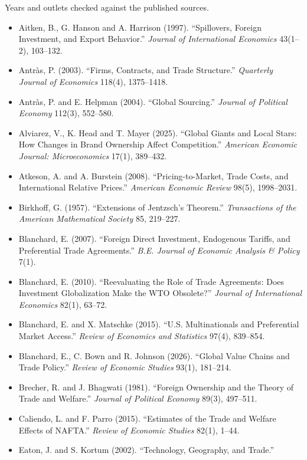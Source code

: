 \documentclass[11pt]{article}
\theoremstyle{plain}
\theoremstyle{remark}
\theoremstyle{definition}
\begin{document}
Years and outlets checked against the published sources.

\begin{itemize}[leftmargin=1.4em]
\item Aitken, B., G. Hanson and A. Harrison (1997). ``Spillovers, Foreign Investment,
and Export Behavior.'' \emph{Journal of International Economics} 43(1--2), 103--132.
\item Antr\`as, P. (2003). ``Firms, Contracts, and Trade Structure.''
\emph{Quarterly Journal of Economics} 118(4), 1375--1418.
\item Antr\`as, P. and E. Helpman (2004). ``Global Sourcing.''
\emph{Journal of Political Economy} 112(3), 552--580.
\item Alviarez, V., K. Head and T. Mayer (2025). ``Global Giants and Local Stars: How
Changes in Brand Ownership Affect Competition.'' \emph{American Economic Journal:
Microeconomics} 17(1), 389--432.
\item Atkeson, A. and A. Burstein (2008). ``Pricing-to-Market, Trade Costs, and
International Relative Prices.'' \emph{American Economic Review} 98(5), 1998--2031.
\item Birkhoff, G. (1957). ``Extensions of Jentzsch's Theorem.''
\emph{Transactions of the American Mathematical Society} 85, 219--227.
\item Blanchard, E. (2007). ``Foreign Direct Investment, Endogenous Tariffs, and
Preferential Trade Agreements.'' \emph{B.E. Journal of Economic Analysis \& Policy}
7(1).
\item Blanchard, E. (2010). ``Reevaluating the Role of Trade Agreements: Does
Investment Globalization Make the WTO Obsolete?'' \emph{Journal of International
Economics} 82(1), 63--72.
\item Blanchard, E. and X. Matschke (2015). ``U.S. Multinationals and Preferential
Market Access.'' \emph{Review of Economics and Statistics} 97(4), 839--854.
\item Blanchard, E., C. Bown and R. Johnson (2026). ``Global Value Chains and Trade
Policy.'' \emph{Review of Economic Studies} 93(1), 181--214.
\item Brecher, R. and J. Bhagwati (1981). ``Foreign Ownership and the Theory of Trade
and Welfare.'' \emph{Journal of Political Economy} 89(3), 497--511.
\item Caliendo, L. and F. Parro (2015). ``Estimates of the Trade and Welfare Effects of
NAFTA.'' \emph{Review of Economic Studies} 82(1), 1--44.
\item Eaton, J. and S. Kortum (2002). ``Technology, Geography, and Trade.''

\end{itemize}
\end{document}
